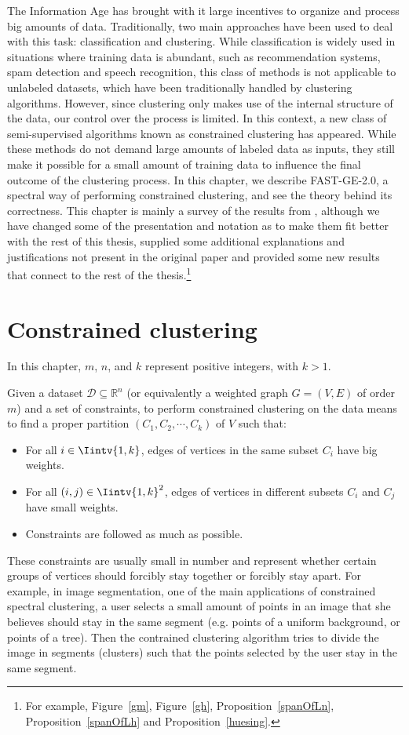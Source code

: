 The Information Age has brought with it large incentives to organize and process big amounts of data.
Traditionally, two main approaches have been used to deal with this task: classification and clustering.
While classification is widely used in situations where training data is abundant, such as recommendation systems, spam detection and speech recognition, this class of methods is not applicable to unlabeled datasets, which have been traditionally handled by clustering algorithms.
However, since clustering only makes use of the internal structure of the data, our control over the process is limited.
In this context, a new class of semi-supervised algorithms known as constrained clustering has appeared.
While these methods do not demand large amounts of labeled data as inputs, they still make it possible for a small amount of training data to influence the final outcome of the clustering process.
In this chapter, we describe FAST-GE-2.0, a spectral way of performing constrained clustering, and see the theory behind its correctness.
This chapter is mainly a survey of the results from \cite{fastge2}, although we have changed some of the presentation and notation as to make them fit better with the rest of this thesis, supplied some additional explanations and justifications not present in the original paper and provided some new results that connect to the rest of the thesis.\footnote{For example, Figure~\vref{gm}, Figure~\vref{gh}, Proposition~\vref{spanOfLn}, Proposition~\vref{spanOfLh} and Proposition~\vref{huesing}.}

\section{Constrained clustering}
In this chapter, $m$, $n$, and $k$ represent positive integers, with $k > 1$.

Given a dataset $\mathcal D \subseteq \mathbb{R}^{n }$ (or equivalently a weighted graph $G = (V,E)$ of order $m$) and a set of constraints, to perform constrained clustering on the data means to find a proper partition $(C_1, C_2, \cdots, C_k)$ of $V$ such that:
\begin{itemize}
   \item For all $i \in \Iintv{1,k}$, edges of vertices in the same subset $C_i$ have big weights.
   \item For all $(i,j) \in \Iintv{1,k}^2$, edges of vertices in different subsets $C_i$ and $C_j$ have small weights.
   \item Constraints are followed as much as possible.
\end{itemize}
These constraints are usually small in number and represent whether certain groups of vertices should forcibly stay together or forcibly stay apart.
For example, in image segmentation, one of the main applications of constrained spectral clustering, a user selects a small amount of points in an image that she believes should stay in the same segment (e.g. points of a uniform background, or points of a tree). Then the contrained clustering algorithm tries to divide the image in segments (clusters) such that the points selected by the user stay in the same segment.


